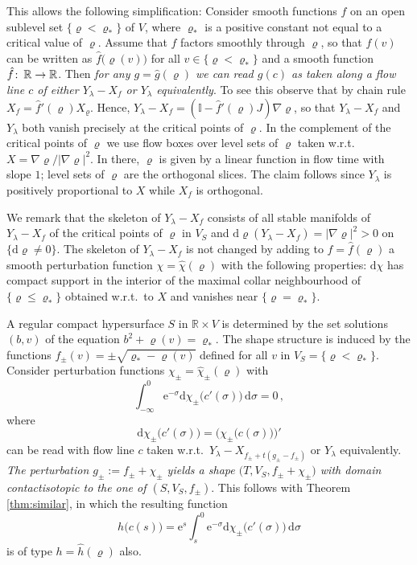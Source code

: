 \documentclass{amsart}
\theoremstyle{definition}
\def\co{\colon\thinspace}
\newcommand{\rmd}{\mathrm d}
\newcommand{\rme}{\mathrm e}
\newcommand{\R}{\mathbb R}
\newcommand{\ra}{\rightarrow}
\begin{document}
  This allows the following simplification:
  Consider smooth functions $f$ on an open sublevel set
  $\{\varrho<\varrho_*\}$ of $V$,
  where $\varrho_*$ is a positive constant
  not equal to a critical value of $\varrho$.
  Assume that $f$ factors smoothly through $\varrho$,
  so that $f(v)$ can be written as $\hat{f}\big(\varrho(v)\big)$
  for all $v\in\{\varrho<\varrho_*\}$
  and a smooth function $\hat{f}\co\R\ra\R$.
  Then {\it for any $g=\hat{g}(\varrho)$
  we can read $g(c)$ as taken along a flow line $c$
  of either $Y_{\lambda}-X_f$ or $Y_{\lambda}$
  equivalently}.
  To see this observe that
  by chain rule $X_f=\hat{f}'(\varrho)X_{\varrho}$.
  Hence,
  $Y_{\lambda}-X_f=(\mathbb{I}-\hat{f}'(\varrho)J)\nabla\!\varrho$,
  so that $Y_{\lambda}-X_f$ and $Y_{\lambda}$
  both vanish precisely at the critical points of $\varrho$.
  In the complement of the critical points of $\varrho$
  we use flow boxes over level sets of $\varrho$
  taken w.r.t.\ $X=\nabla\!\varrho/|\nabla\!\varrho|^2$.
  In there,
  $\varrho$ is given by a linear function
  in flow time with slope $1$;
  level sets of $\varrho$ are the orthogonal slices.
  The claim follows
  since $Y_{\lambda}$ is positively proportional to $X$
  while $X_f$ is orthogonal.
  
  We remark that the skeleton of $Y_{\lambda}-X_f$
  consists of all stable manifolds of $Y_{\lambda}-X_f$
  of the critical points of $\varrho$ in $V_S$
  and $\rmd\varrho(Y_{\lambda}-X_f)=|\nabla\!\varrho|^2>0$
  on $\{\rmd\varrho\neq0\}$.
  The skeleton of $Y_{\lambda}-X_f$ is not changed
  by adding to $f=\hat{f}(\varrho)$
  a smooth perturbation function $\chi=\hat{\chi}(\varrho)$
  with the following properties:
  $\rmd\chi$ has compact support in the interior of 
  the maximal collar neighbourhood of $\{\varrho\leq\varrho_*\}$
  obtained w.r.t.\ to $X$
  and vanishes near $\{\varrho=\varrho_*\}$.
  
  A regular compact hypersurface $S$ in $\R\times V$
  is determined by the set solutions $(b,v)$
  of the equation $b^2+\varrho(v)=\varrho_*$.
  The shape structure is induced by the functions
  $f_{\pm}(v)=\pm\sqrt{\varrho_*-\varrho(v)}$
  defined for all $v$ in $V_S=\{\varrho<\varrho_*\}$.
  Consider perturbation functions $\chi_{\pm}=\hat{\chi}_{\pm}(\varrho)$
  with
  \[
        \int_{-\infty}^0
          \rme^{-\sigma}
          \rmd\chi_{\pm}
          \big(c'(\sigma)\big)\,
        \rmd\sigma
        =0
        \,,
  \]
  where
  \[
  \rmd\chi_{\pm}\big(c'(\sigma)\big)
  =\Big(\chi_{\pm}\big(c(\sigma)\big)\Big)'
  \]
  can be read with flow line $c$ taken w.r.t.\
  $Y_{\lambda}-X_{f_{\pm}+t(g_{\pm}-f_{\pm})}$
  or $Y_{\lambda}$ equivalently.
  {\it The perturbation $g_{\pm}:=f_{\pm}+\chi_{\pm}$
  yields a shape $\big(T,V_S,f_{\pm}+\chi_{\pm}\big)$
  with domain contactisotopic to the one of $(S,V_S,f_{\pm})$}.
  This follows with Theorem \ref{thm:similar},
  in which the resulting function
  \[
    h\big(c(s)\big)=
    \rme^s
        \int_s^0
          \rme^{-\sigma}
          \rmd\chi_{\pm}
          \big(c'(\sigma)\big)\,
        \rmd\sigma
  \]
  is of type $h=\hat{h}(\varrho)$ also.
\end{document}
